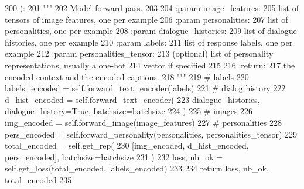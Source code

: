 \begin{DoxyCode}
200     ):
201         \textcolor{stringliteral}{"""}
202 \textcolor{stringliteral}{        Model forward pass.}
203 \textcolor{stringliteral}{}
204 \textcolor{stringliteral}{        :param image\_features:}
205 \textcolor{stringliteral}{            list of tensors of image features, one per example}
206 \textcolor{stringliteral}{        :param personalities:}
207 \textcolor{stringliteral}{            list of personalities, one per example}
208 \textcolor{stringliteral}{        :param dialogue\_histories:}
209 \textcolor{stringliteral}{            list of dialogue histories, one per example}
210 \textcolor{stringliteral}{        :param labels:}
211 \textcolor{stringliteral}{            list of response labels, one per example}
212 \textcolor{stringliteral}{        :param personalities\_tensor:}
213 \textcolor{stringliteral}{            (optional) list of personality representations, usually a one-hot}
214 \textcolor{stringliteral}{            vector if specified}
215 \textcolor{stringliteral}{}
216 \textcolor{stringliteral}{        :return:}
217 \textcolor{stringliteral}{            the encoded context and the encoded captions.}
218 \textcolor{stringliteral}{        """}
219         \textcolor{comment}{# labels}
220         labels\_encoded = self.forward\_text\_encoder(labels)
221         \textcolor{comment}{# dialog history}
222         d\_hist\_encoded = self.forward\_text\_encoder(
223             dialogue\_histories, dialogue\_history=\textcolor{keyword}{True}, batchsize=batchsize
224         )
225         \textcolor{comment}{# images}
226         img\_encoded = self.forward\_image(image\_features)
227         \textcolor{comment}{# personalities}
228         pers\_encoded = self.forward\_personality(personalities, personalities\_tensor)
229         total\_encoded = self.get\_rep(
230             [img\_encoded, d\_hist\_encoded, pers\_encoded], batchsize=batchsize
231         )
232         loss, nb\_ok = self.get\_loss(total\_encoded, labels\_encoded)
233 
234         \textcolor{keywordflow}{return} loss, nb\_ok, total\_encoded
235 
\end{DoxyCode}
\mbox{\label{classprojects_1_1image__chat_1_1transresnet__multimodal_1_1modules_1_1TransresnetMultimodalModel_ab6a9e6cfce463a5011e52f9740e70d4f}} 
